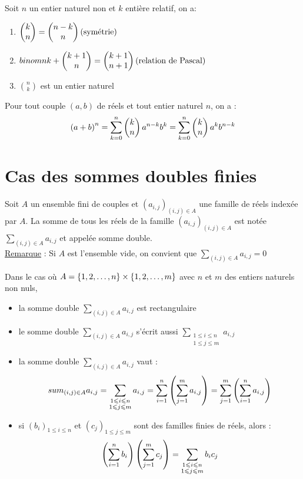 \begin{defprop}
	Soit \(n\) un entier naturel non et \(k\) entière relatif, on a:
	\begin{enumerate}
		\item \(\binom{n}{k} = \binom{n}{n-k} \hfill \text{(symétrie)}\)
		\item \(binom{n}{k} +\binom{n}{k+1} = \binom{n+1}{k+1} \hfill \text{(relation de Pascal)}\)
		\item \(\binom{n}{k} \) est un entier naturel
	\end{enumerate}
\end{defprop}

\begin{defprop}
	Pour tout couple \((a,b)\) de réels et tout entier naturel \(n\), on a :
	\[\paren{a+b}^n = \sum_{k=0}^n \binom{n}{k} a^{n-k}b^k = \sum_{k=0}^n \binom{n}{k} a^{k}b^{n-k}\]
\end{defprop}


\section{Cas des sommes doubles finies}
\begin{defi}
	Soit \(A\) un ensemble fini de couples et \((a_{i,j})_{(i,j)\in A}\) une famille de réels indexée par \(A\). La somme de tous les réels de la famille \((a_{i,j})_{(i,j)\in A}\) est notée \(\sum_{(i,j)\in A} a_{i,j}\) et appelée somme double. \\
	\underline{Remarque} : Si \(A\) est l'ensemble vide, on convient que \(\sum_{(i,j)\in A} a_{i,j} = 0\)
\end{defi}
\begin{defprop}
	Dans le cas où \(A = \accol{1,2,\ldots,n}\times \accol{1,2,\ldots,m}\) avec \(n\) et \(m\) des entiers naturels non nuls,
	\begin{itemize}
		\item la somme double \(\sum_{(i,j)\in A} a_{i,j}\) est rectangulaire
		\item le somme double \(\sum_{(i,j)\in A} a_{i,j}\) s'écrit aussi \(\sum_{\substack{1 \leq i \leq n \\ 1 \leq j \leq m}} a_{i,j}\)
		\item la somme double \(\sum_{(i,j)\in A} a_{i,j}\) vaut  :
		      \[ sum_{(i,j)\in A} a_{i,j} = \sum_{\substack{1 \leq i \leq n \\ 1 \leq j \leq m}} a_{i,j} = \sum_{i=1}^n \paren{\sum_{j=1}^m a_{i,j}} = \sum_{j=1}^m \paren{\sum_{i=1}^n a_{i,j}} \]
		\item si \((b_i)_{1\leq i \leq n}\) et \((c_j)_{1\leq j \leq m}\) sont des familles finies de réels, alors : \[\paren{\sum_{i=1}^n b_i}\paren{\sum_{j=1}^m c_j} = \sum_{\substack{1 \leq i \leq n \\ 1 \leq j \leq m}} b_i c_j\]
	\end{itemize}
\end{defprop}

